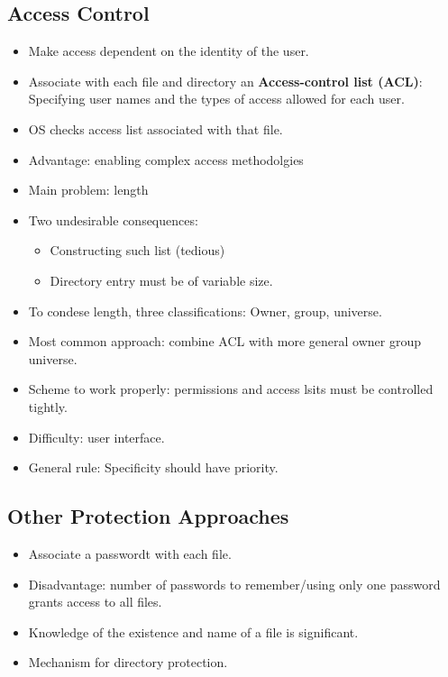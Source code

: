 \documentclass[10pt]{report}
\begin{document}
		\subsection{Access Control}
			\begin{itemize}
					\item Make access dependent on the identity of the user.
					\item Associate with each file and directory an \textbf{Access-control list (ACL)}: Specifying user names and the types of access allowed for each user.
					\item OS checks access list associated with that file.
					\item Advantage: enabling complex access methodolgies
					\item Main problem: length
					\item Two undesirable consequences:
					\begin{itemize}
							\item Constructing such list (tedious)
							\item Directory entry must be of variable size.
					\end{itemize}
					\item To condese length, three classifications: Owner, group, universe.
					\item Most common approach: combine ACL with more general owner group universe.
					\item Scheme to work properly: permissions and access lsits must be controlled tightly.
					\item Difficulty: user interface.
					\item General rule: Specificity should have priority.
			\end{itemize}

		\subsection{Other Protection Approaches}
			\begin{itemize}
					\item Associate a passwordt with each file.
					\item Disadvantage: number of passwords to remember/using only one password grants access to all files.
					\item Knowledge of the existence and name of a file is significant.
					\item Mechanism for directory protection.
			\end{itemize}
\end{document}
